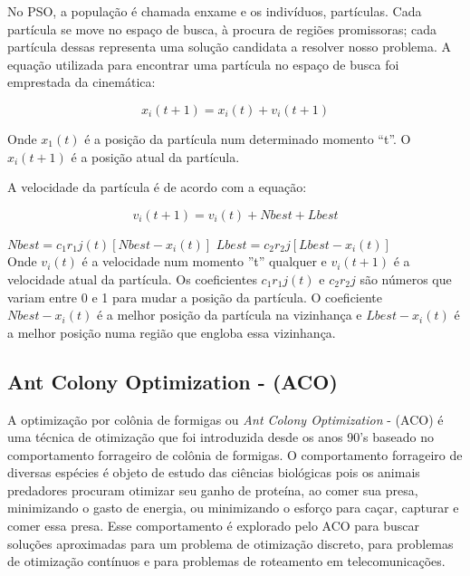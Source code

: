 \documentclass[conference,compsoc]{IEEEtran}
\begin{document}
No PSO, a população é chamada enxame e os indivíduos, partículas. Cada partícula se move no espaço de busca, 
à procura de regiões promissoras; cada partícula dessas representa uma solução candidata a resolver nosso problema.
A equação utilizada para encontrar uma partícula no espaço de busca foi emprestada da cinemática:

\begin{equation}
x_i(t+1) = x_i(t) + v_i(t+1)
\end{equation}

Onde $x_1(t)$ é a posição da partícula num determinado momento ``t''. O $x_i(t+1) $ é a posição atual da partícula.

A velocidade da partícula é de acordo com a equação:

\begin{equation}
v_i(t+1) = v_i(t) + Nbest + Lbest
\end{equation}

\flushleft $Nbest = c_1r_1j(t)[Nbest - x_i(t)]$
\flushleft $Lbest = c_2r_2j[Lbest - x_i(t)]$\\

Onde $v_i(t)$ é a velocidade num momento ''t'' qualquer e $v_i(t+1)$ é a velocidade atual da partícula.
Os coeficientes $c_1r_1j(t)$ e $c_2r_2j$ são números que variam entre 0 e 1 para mudar a posição da partícula.
O coeficiente $Nbest - x_i(t)$ é a melhor posição da partícula na vizinhança e $Lbest - x_i(t)$ é a melhor posição
numa região que engloba essa vizinhança.

\subsection{Ant Colony Optimization - (ACO) }\label{arte:algo:aco}

A optimização por colônia de formigas ou \textit{Ant Colony Optimization} - (ACO) é uma técnica de otimização que foi
introduzida desde os anos 90's \cite{Blum2005} baseado no comportamento forrageiro de colônia de formigas.
O comportamento forrageiro de diversas espécies \cite{Dorigo2005} é objeto de estudo das ciências biológicas pois os animais predadores 
procuram otimizar seu ganho de proteína, ao comer sua presa, minimizando o gasto de energia, ou minimizando o esforço para
caçar, capturar e comer essa presa. Esse comportamento é explorado pelo ACO para buscar soluções aproximadas para um
problema de otimização discreto, para problemas de otimização contínuos e para problemas de roteamento em telecomunicações.
\end{document}
